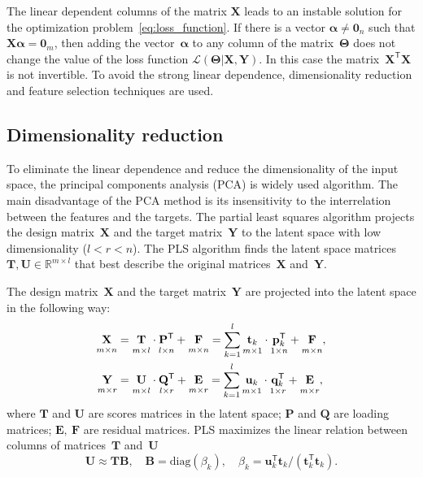 \documentclass[12pt,oneside]{article}
\theoremstyle{definition}
\newcommand{\bY}{\mathbf{Y}}
\newcommand{\bX}{\mathbf{X}}
\newcommand{\bu}{\mathbf{u}}
\newcommand{\bt}{\mathbf{t}}
\newcommand{\bp}{\mathbf{p}}
\newcommand{\bq}{\mathbf{q}}
\newcommand{\bP}{\mathbf{P}}
\newcommand{\bT}{\mathbf{T}}
\newcommand{\bB}{\mathbf{B}}
\newcommand{\bQ}{\mathbf{Q}}
\newcommand{\bE}{\mathbf{E}}
\newcommand{\bF}{\mathbf{F}}
\newcommand{\bU}{\mathbf{U}}
\newcommand{\T}{\mathsf{T}}
\newcommand{\bTheta}{\boldsymbol{\Theta}}
\newcommand{\bZero}{\boldsymbol{0}}
\begin{document}
 The linear dependent columns of the matrix $\bX$ leads to an instable solution for the optimization problem~\eqref{eq:loss_function}.
 If there is a vector $\boldsymbol{\alpha} \neq \bZero_n$ such that $\bX \boldsymbol{\alpha}= \bZero_m$, then adding the vector~$\boldsymbol{\alpha}$ to any column of the matrix~$\bTheta$ does not change the value of the loss function $\mathcal{L}(\bTheta | \bX, \bY)$.
 In this case the matrix~$\bX^{\T} \bX$ is not invertible.
 To avoid the strong linear dependence, dimensionality reduction and feature selection techniques are used.
 
 
 \subsection{Dimensionality reduction}

To eliminate the linear dependence and reduce the dimensionality of the input space, the principal components analysis (PCA) is widely used algorithm. 
The main disadvantage of the PCA method is its insensitivity to the interrelation between the features and the targets.
The partial least squares algorithm projects the design matrix~$\bX$ and the target matrix~$\bY$ to the latent space with low dimensionality ($l < r < n$).
The PLS algorithm finds the latent space matrices $\bT, \bU \in \mathbb{R}^{m \times l}$ that best describe the original matrices~$\bX$ and~$\bY$.

The design matrix~$\bX$ and the target matrix~$\bY$ are projected into the latent space in the following way:
\begin{align}
\label{eq:PLS_X}
\underset{m \times n}{\vphantom{\bQ}\bX} 
&= \underset{m \times l}{\vphantom{\bQ}\bT} \cdot \underset{l \times n}{\vphantom{\bQ}\bP^{\T}} + \underset{m \times n}{\vphantom{\bQ}\bF} 
= \sum_{k=1}^l \underset{m \times 1}{\vphantom{\bp_k^{\T}}\bt_k} \cdot \underset{1 \times n}{\bp_k^{\T}} + \underset{m \times n}{\vphantom{\bp_k^{\T}}\bF},\\
\label{eq:PLS_Y}
\underset{m \times r}{\vphantom{\bQ}\bY} 
&= \underset{m \times l}{\vphantom{\bQ}\bU} \cdot \underset{l \times r}{\bQ^{\T}} + \underset{m \times r}{\vphantom{\bQ}\bE}
=  \sum_{k=1}^l  \underset{m \times 1}{\vphantom{\bq_k^{\T}}\bu_k} \cdot \underset{1 \times r}{\bq_k^{\T}} +  \underset{m \times r}{\vphantom{\bq_k^{\T}}\bE},
\end{align}
where $\bT$ and $\bU$ are scores matrices in the latent space; $\bP$ and $\bQ$ are loading matrices; $\bE,\ \bF$ are residual matrices. PLS maximizes the linear relation between columns of matrices~$\bT$ and~$\bU$
\begin{equation}
\bU \approx \bT \bB, \quad \bB = \text{diag}(\beta_k), \quad \beta_k = \bu_k^{\T}\bt_k / (\bt_k^{\T}\bt_k).
\end{equation}
\end{document}
